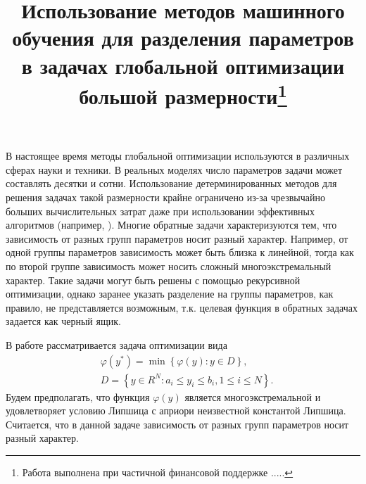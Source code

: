 \documentclass[11pt, oneside, a4paper]{article}
\begin{document}
\setcounter{page}{1}



\title{Использование методов машинного обучения для разделения параметров в задачах глобальной оптимизации большой размерности\footnote{Работа выполнена при частичной финансовой поддержке .....}}





\bigskip

В настоящее время методы глобальной оптимизации используются в различных сферах науки и техники. В реальных моделях число параметров задачи может составлять десятки и сотни. Использование детерминированных методов для решения задачах такой размерности крайне ограничено из-за чрезвычайно больших вычислительных затрат даже при использовании эффективных алгоритмов (например, \cite{Paulavicius2011,Evtushenko2009,Jones2009}). 
Многие обратные задачи характеризуются тем, что зависимость от разных групп параметров носит разный характер. Например, от одной группы параметров зависимость может быть близка к линейной, тогда как по второй группе зависимость может носить сложный многоэкстремальный характер. Такие задачи могут быть решены с помощью рекурсивной оптимизации, однако заранее указать разделение на группы параметров, как правило, не представляется возможным, т.к. целевая функция в обратных задачах задается как черный ящик. 

В работе рассматривается задача оптимизации вида 
\begin{eqnarray}\label{main_problem}
& \varphi(y^\ast)=\min{\left\{\varphi(y): y\in D\right\}}, \nonumber \\
& D=\left\{y\in R^N: a_i\leq y_i \leq b_i, 1\leq i \leq N\right\}. \nonumber
\end{eqnarray}
Будем предполагать, что функция $\varphi(y)$ является многоэкстремальной и удовлетворяет условию Липшица с априори неизвестной константой Липшица. Считается, что в данной задаче зависимость от разных групп параметров носит разный характер.
\end{document}
